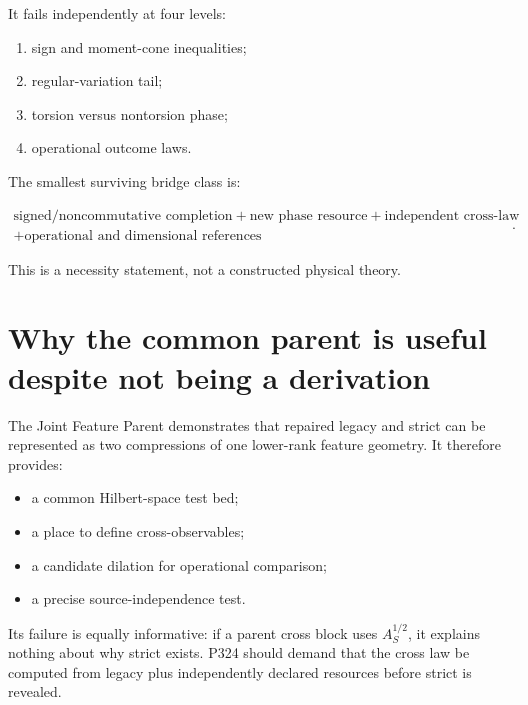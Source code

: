 \documentclass[11pt,a4paper,openany]{report}
\begin{document}
It fails independently at four levels:

\begin{enumerate}
\item 
sign and moment-cone inequalities;

\item 
regular-variation tail;

\item 
torsion versus nontorsion phase;

\item 
operational outcome laws.

\end{enumerate}

The smallest surviving bridge class is:

\[
\boxed{\begin{gathered}
\text{signed/noncommutative completion}
+\text{new phase resource}
+\text{independent cross-law}\\
+\text{operational and dimensional references}
\end{gathered}}.
\]

This is a necessity statement, not a constructed physical theory.

\section{Why the common parent is useful despite not being a derivation}

The Joint Feature Parent demonstrates that repaired legacy and strict can be represented as two compressions of one lower-rank feature geometry. It therefore provides:

\begin{itemize}
\item 
a common Hilbert-space test bed;

\item 
a place to define cross-observables;

\item 
a candidate dilation for operational comparison;

\item 
a precise source-independence test.

\end{itemize}

Its failure is equally informative: if a parent cross block uses \(A_S^{1/2}\), it explains nothing about why strict exists. P324 should demand that the cross law be computed from legacy plus independently declared resources before strict is revealed.
\end{document}
